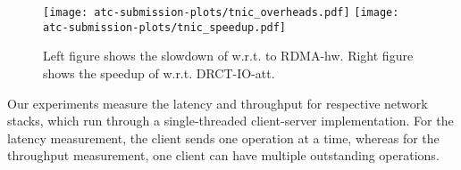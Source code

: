 


\begin{figure}[t!]
\begin{center}
  \centering
  \texttt{[image: atc-submission-plots/tnic\_overheads.pdf]} 
\endminipage
{}
  \centering
  \texttt{[image: atc-submission-plots/tnic\_speedup.pdf]} 
\endminipage
\end{center}
\caption{Left figure shows the slowdown of \projecttitle{} w.r.t. to RDMA-hw. Right figure shows the speedup of \projecttitle{} w.r.t. DRCT-IO-att.}\label{fig:net_slowdown}
\end{figure}
\fi




Our experiments measure the latency and throughput for respective network stacks, which run through a single-threaded client-server implementation.
For the latency measurement, the client sends one operation at a time, whereas for the throughput measurement, one client can have multiple outstanding operations.








